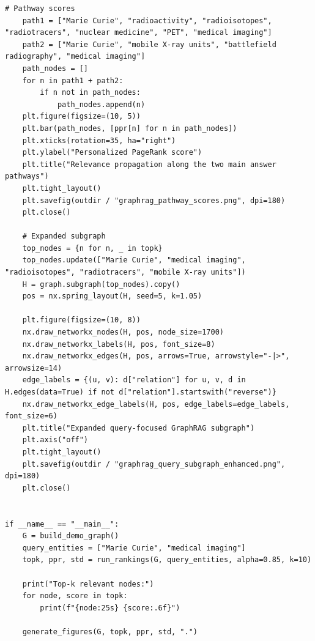 \documentclass[12pt]{article}
\begin{document}
\begin{lstlisting}[style=pythonstyle]
    # Pathway scores
    path1 = ["Marie Curie", "radioactivity", "radioisotopes", "radiotracers", "nuclear medicine", "PET", "medical imaging"]
    path2 = ["Marie Curie", "mobile X-ray units", "battlefield radiography", "medical imaging"]
    path_nodes = []
    for n in path1 + path2:
        if n not in path_nodes:
            path_nodes.append(n)
    plt.figure(figsize=(10, 5))
    plt.bar(path_nodes, [ppr[n] for n in path_nodes])
    plt.xticks(rotation=35, ha="right")
    plt.ylabel("Personalized PageRank score")
    plt.title("Relevance propagation along the two main answer pathways")
    plt.tight_layout()
    plt.savefig(outdir / "graphrag_pathway_scores.png", dpi=180)
    plt.close()

    # Expanded subgraph
    top_nodes = {n for n, _ in topk}
    top_nodes.update(["Marie Curie", "medical imaging", "radioisotopes", "radiotracers", "mobile X-ray units"])
    H = graph.subgraph(top_nodes).copy()
    pos = nx.spring_layout(H, seed=5, k=1.05)

    plt.figure(figsize=(10, 8))
    nx.draw_networkx_nodes(H, pos, node_size=1700)
    nx.draw_networkx_labels(H, pos, font_size=8)
    nx.draw_networkx_edges(H, pos, arrows=True, arrowstyle="-|>", arrowsize=14)
    edge_labels = {(u, v): d["relation"] for u, v, d in H.edges(data=True) if not d["relation"].startswith("reverse")}
    nx.draw_networkx_edge_labels(H, pos, edge_labels=edge_labels, font_size=6)
    plt.title("Expanded query-focused GraphRAG subgraph")
    plt.axis("off")
    plt.tight_layout()
    plt.savefig(outdir / "graphrag_query_subgraph_enhanced.png", dpi=180)
    plt.close()


if __name__ == "__main__":
    G = build_demo_graph()
    query_entities = ["Marie Curie", "medical imaging"]
    topk, ppr, std = run_rankings(G, query_entities, alpha=0.85, k=10)

    print("Top-k relevant nodes:")
    for node, score in topk:
        print(f"{node:25s} {score:.6f}")

    generate_figures(G, topk, ppr, std, ".")


\end{lstlisting}
\end{document}
